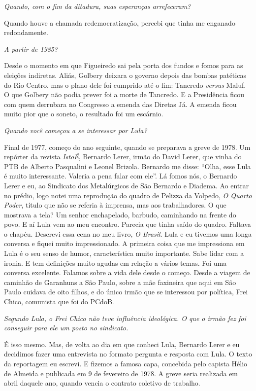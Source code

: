 \itshape
 Quando, com o fim da ditadura, suas esperanças
arrefeceram?

\normalfont 
Quando houve a chamada redemocratização, percebi que
tinha me enganado redondamente.

\itshape
 A partir de 1985?

\normalfont 
Desde o momento em que Figueiredo sai pela porta dos
fundos e fomos para as eleições indiretas. Aliás, Golbery deixara o
governo depois das bombas patéticas do Rio Centro, mas o plano dele foi
cumprido até o fim: Tancredo \emph{versus} Maluf. O que Golbery não
podia prever foi a morte de Tancredo. E a Presidência ficou com quem
derrubara no Congresso a emenda das Diretas Já. A emenda ficou muito
pior que o soneto, o resultado foi um escárnio.

\itshape
 Quando você começou a se interessar por Lula?

\normalfont 
Final de 1977, começo do ano seguinte, quando se
preparava a greve de 1978. Um repórter da revista \emph{IstoÉ}, Bernardo
Lerer, irmão do David Lerer, que vinha do PTB de Alberto Pasqualini e
Leonel Brizola. Bernardo me disse: ``Olha, esse Lula é muito
interessante. Valeria a pena falar com ele''. Lá fomos nós, o Bernardo
Lerer e eu, ao Sindicato dos Metalúrgicos de São Bernardo e Diadema. Ao
entrar no prédio, logo notei uma reprodução do quadro de Pelizza da
Volpedo, \emph{O Quarto Poder}, título que não se referia à imprensa,
mas aos trabalhadores. O que mostrava a tela? Um senhor enchapelado,
barbudo, caminhando na frente do povo. E aí Lula vem ao meu encontro.
Parecia que tinha saído do quadro. Faltava o chapéu. Descrevi essa cena
no meu livro, \emph{O Brasil}. Lula e eu tivemos uma longa conversa e
fiquei muito impressionado. A primeira coisa que me impressiona em Lula
é o seu senso de humor, característica muito importante. Sabe lidar com
a ironia. E tem definições muito agudas em relação a vários temas. Foi
uma conversa excelente. Falamos sobre a vida dele desde o começo. Desde
a viagem de caminhão de Garanhuns a São Paulo, sobre a mãe faxineira que
aqui em São Paulo cuidava de oito filhos, e do único irmão que se
interessou por política, Frei Chico, comunista que foi do PCdoB.

\itshape
 Segundo Lula, o Frei Chico não teve influência
ideológica. O que o irmão fez foi conseguir para ele um posto no
sindicato.

\normalfont 
É isso mesmo. Mas, de volta ao dia em que conheci Lula,
Bernardo Lerer e eu decidimos fazer uma entrevista no formato pergunta e
resposta com Lula. O texto da reportagem eu escrevi. E fizemos a famosa
capa, concebida pelo capista Hélio de Almeida e publicada em 9 de
fevereiro de 1978. A greve seria realizada em abril daquele ano, quando
vencia o contrato coletivo de trabalho.

